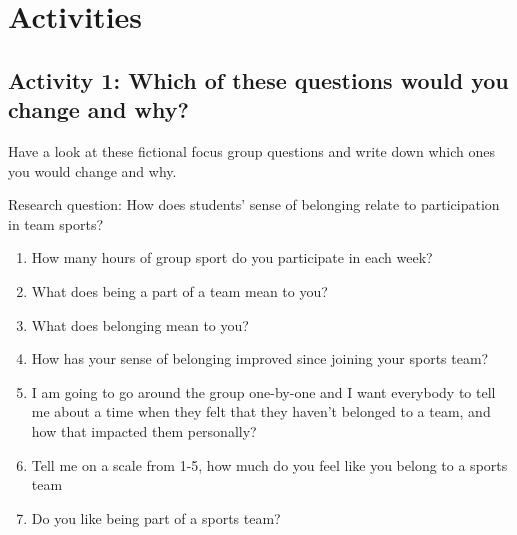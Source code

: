 \documentclass[
  english,
  letterpaper,
  DIV=11,
  numbers=noendperiod]{scrreprt}
\providecommand{\tightlist}{%
  \setlength{\itemsep}{0pt}\setlength{\parskip}{0pt}}
\begin{document}
\section{Activities}\label{activities}

\subsection{Activity 1: Which of these questions would you change and
why?}\label{activity-1-which-of-these-questions-would-you-change-and-why}

Have a look at these fictional focus group questions and write down
which ones you would change and why.

Research question: How does students' sense of belonging relate to
participation in team sports?

\begin{enumerate}
\def\labelenumi{\arabic{enumi}.}
\tightlist
\item
  How many hours of group sport do you participate in each week?
\item
  What does being a part of a team mean to you?
\item
  What does belonging mean to you?
\item
  How has your sense of belonging improved since joining your sports
  team?
\item
  I am going to go around the group one-by-one and I want everybody to
  tell me about a time when they felt that they haven't belonged to a
  team, and how that impacted them personally?
\item
  Tell me on a scale from 1-5, how much do you feel like you belong to a
  sports team
\item
  Do you like being part of a sports team?
\end{enumerate}
\end{document}
